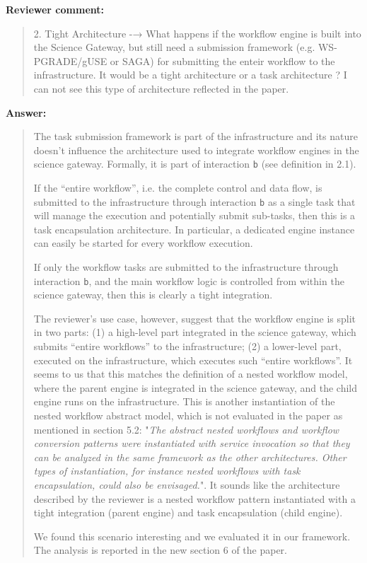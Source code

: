 \documentclass[a4]{article}
\newenvironment{review}%
{\textbf{Reviewer comment:}\begin{quote}}%
{\end{quote}}%
\newenvironment{answer}%
{\textbf{Answer:}\begin{small}\begin{quote}}%
{\end{quote}\end{small}}%
\begin{document}
\begin{review}
  2. Tight Architecture -→ What happens if the workflow engine is
  built into the Science Gateway, but still need a submission
  framework (e.g. WS-PGRADE/gUSE or SAGA) for submitting the enteir
  workflow to the infrastructure.  It would be a tight architecture or
  a task architecture ? I can not see this type of architecture
  reflected in the paper.
\end{review}

\begin{answer}
  The task submission framework is part of the infrastructure
  and its nature doesn't influence the architecture used to integrate
  workflow engines in the science gateway. Formally, it is part of
  interaction \texttt{b} (see definition in 2.1).

  If the ``entire workflow'', i.e. the complete control and data flow,
  is submitted to the infrastructure through interaction \texttt{b} as
  a single task that will manage the execution and potentially submit
  sub-tasks, then this is a task encapsulation architecture. In
  particular, a dedicated engine instance can easily be started for
  every workflow execution.

  If only the workflow tasks are submitted to the infrastructure
  through interaction \texttt{b}, and the main workflow logic is
  controlled from within the science gateway, then this is clearly a
  tight integration.

  The reviewer's use case, however, suggest that the workflow engine
  is split in two parts: (1) a high-level part integrated in the
  science gateway, which submits ``entire workflows'' to the
  infrastructure; (2) a lower-level part, executed on the
  infrastructure, which executes such ``entire workflows''. It seems
  to us that this matches the definition of a nested workflow model,
  where the parent engine is integrated in the science gateway, and
  the child engine runs on the infrastructure. This is another
  instantiation of the nested workflow abstract model, which is not
  evaluated in the paper as mentioned in section 5.2: "\emph{The
    abstract nested workflows and workflow conversion patterns were
    instantiated with service invocation so that they can be analyzed
    in the same framework as the other architectures. Other types of
    instantiation, for instance nested workflows with task
    encapsulation, could also be envisaged.}". It sounds like the
  architecture described by the reviewer is a nested workflow pattern
  instantiated with a tight integration (parent engine) and task
  encapsulation (child engine).

  We found this scenario interesting and we evaluated it in our
  framework. The analysis is reported in the new section 6 of the
  paper.
\end{answer}
\end{document}
